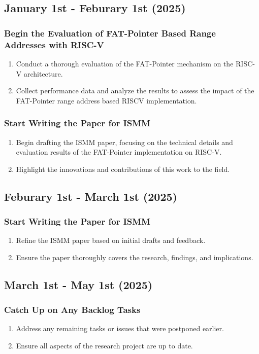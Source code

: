 \subsection{January 1st - Feburary 1st (2025)}
\subsubsection{Begin the Evaluation of FAT-Pointer Based Range Addresses with RISC-V}
\begin{enumerate}
    \item Conduct a thorough evaluation of the FAT-Pointer mechanism on the RISC-V architecture.
    \item Collect performance data and analyze the results to assess the impact of the FAT-Pointer range address based RISCV implementation.
\end{enumerate}
\subsubsection{Start Writing the Paper for ISMM}
\begin{enumerate}
    \item Begin drafting the ISMM paper, focusing on the technical details and evaluation results of the FAT-Pointer implementation on RISC-V.
    \item Highlight the innovations and contributions of this work to the field.
\end{enumerate}

\subsection{Feburary 1st - March 1st (2025)}
\subsubsection{Start Writing the Paper for ISMM}
\begin{enumerate}
    \item Refine the ISMM paper based on initial drafts and feedback.
    \item Ensure the paper thoroughly covers the research, findings, and implications.
\end{enumerate}

\subsection{March 1st - May 1st (2025)}
\subsubsection{Catch Up on Any Backlog Tasks}
\begin{enumerate}
    \item Address any remaining tasks or issues that were postponed earlier.
    \item Ensure all aspects of the research project are up to date.
\end{enumerate}
